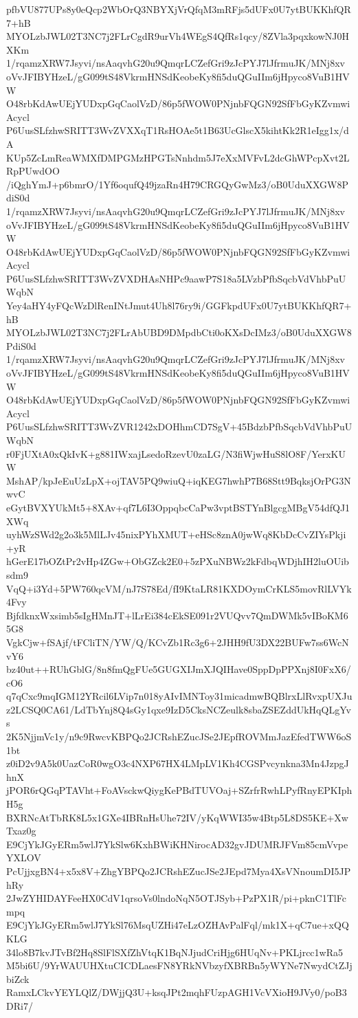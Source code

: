 pfbVU877UPs8y0eQcp2WbOrQ3NBYXjVrQfqM3mRFjs5dUFx0U7ytBUKKhfQR7+hB
MYOLzbJWL02T3NC7j2FLrCgdR9urVh4WEgS4QfRs1qcy/8ZVla3pqxkowNJ0HXKm
1/rqamzXRW7Jsyvi/nsAaqvhG20u9QmqrLCZefGri9zJcPYJ7lJfrmuJK/MNj8xv
oVvJFIBYHzeL/gG099tS48VkrmHNSdKeobeKy8fi5duQGuIIm6jHpyco8VuB1HVW
O48rbKdAwUEjYUDxpGqCaolVzD/86p5fWOW0PNjnbFQGN92SfFbGyKZvmwiAcycl
P6UusSLfzhwSRITT3WvZVXXqT1RsHOAe5t1B63UcGlscX5kihtKk2R1eIgg1x/dA
KUp5ZcLmReaWMXfDMPGMzHPGTsNnhdm5J7eXxMVFvL2dcGhWPcpXvt2LRpPUwdOO
/iQghYmJ+p6bmrO/1Yf6oqufQ49jzaRn4H79CRGQyGwMz3/oB0UduXXGW8PdiS0d
1/rqamzXRW7Jsyvi/nsAaqvhG20u9QmqrLCZefGri9zJcPYJ7lJfrmuJK/MNj8xv
oVvJFIBYHzeL/gG099tS48VkrmHNSdKeobeKy8fi5duQGuIIm6jHpyco8VuB1HVW
O48rbKdAwUEjYUDxpGqCaolVzD/86p5fWOW0PNjnbFQGN92SfFbGyKZvmwiAcycl
P6UusSLfzhwSRITT3WvZVXDHAsNHPc9aawP7S18a5LVzbPfbSqcbVdVhbPuUWqbN
Yey4aHY4yFQcWzDlRenINtJmut4Uh8l76ry9i/GGFkpdUFx0U7ytBUKKhfQR7+hB
MYOLzbJWL02T3NC7j2FLrAbUBD9DMpdbCti0oKXsDcIMz3/oB0UduXXGW8PdiS0d
1/rqamzXRW7Jsyvi/nsAaqvhG20u9QmqrLCZefGri9zJcPYJ7lJfrmuJK/MNj8xv
oVvJFIBYHzeL/gG099tS48VkrmHNSdKeobeKy8fi5duQGuIIm6jHpyco8VuB1HVW
O48rbKdAwUEjYUDxpGqCaolVzD/86p5fWOW0PNjnbFQGN92SfFbGyKZvmwiAcycl
P6UusSLfzhwSRITT3WvZVR1242xDOHhmCD7SgV+45BdzbPfbSqcbVdVhbPuUWqbN
r0FjUXtA0xQkIvK+g881IWxajLsedoRzevU0zaLG/N3fiWjwHuS8lO8F/YerxKUW
MshAP/kpJeEuUzLpX+ojTAV5PQ9wiuQ+iqKEG7hwhP7B68Stt9BqksjOrPG3NwvC
eGytBVXYUkMt5+8XAv+qf7L6I3OppqbcCaPw3vptBSTYnBlgcgMBgV54dfQJ1XWq
uyhWzSWd2g2o3k5MlLJv45nixPYhXMUT+eHSc8znA0jwWq8KbDcCvZIYsPkji+yR
hGerE17bOZtPr2vHp4ZGw+ObGZck2E0+5zPXuNBWz2kFdbqWDjhIH2luOUibsdm9
VqQ+i3Yd+5PW760qcVM/nJ7S78Ed/fI9KtaLR81KXDOymCrKLS5movRlLVYk4Fvy
BjfdknxWxsimb5sIgHMnJT+lLrEi384cEkSE091r2VUQvv7QmDWMk5vIBoKM65G8
VgkCjw+fSAjf/tFCliTN/YW/Q/KCvZb1Rc3g6+2JHH9fU3DX22BUFw7ss6WcNvY6
bz40ut++RUhGblG/8n8fmQgFUe5GUGXIJmXJQIHave0SppDpPPXnj8I0FxX6/cO6
q7qCxc9mqIGM12YRcil6LVip7n018yAIvIMNToy31micadmwBQBlrxLlRvxpUXJu
z2LCSQ0CA61/LdTbYnj8Q4sGy1qxe9IzD5CksNCZeulk8sbaZSEZddUkHqQLgYvs
2K5NjjmVc1y/n9c9RwcvKBPQo2JCRshEZucJSe2JEpfROVMmJazEfedTWW6oS1bt
z0iD2v9A5k0UazCoR0wgO3c4NXP67HX4LMpLV1Kh4CGSPvcynkna3Mn4JzpgJhnX
jPOR6rQGqPTAVht+FoAVsckwQiygKePBdTUVOaj+SZrfrRwhLPyfRnyEPKIphH5g
BXRNcAtTbRK8L5x1GXe4IBRnHsUhe72IV/yKqWWI35w4Btp5L8DS5KE+XwTxaz0g
E9CjYkJGyERm5wlJ7YkSlw6KxhBWiKHNirocAD32gvJDUMRJFVm85cmVvpeYXLOV
PcUjjxgBN4+x5x8V+ZhgYBPQo2JCRshEZucJSe2JEpd7Mya4XsVNnoumDI5JPhRy
2JwZYHIDAYFeeHX0CdV1qrsoVs0lndoNqN5OTJSyb+PzPX1R/pi+pknC1TlFcmpq
E9CjYkJGyERm5wlJ7YkSl76MsqUZHi47eLzOZHAvPalFql/mk1X+qC7ue+xQQKLG
34lo8B7kvJTvBf2Hq8SlFlSXfZhVtqK1BqNJjudCriHjg6HUqNv+PKLjrcc1wRa5
M5bi6U/9YrWAUUHXtuCICDLaesFN8YRkNVbzyfXBRBn5yWYNe7NwydCtZJjbiZck
RamxLCkvYEYLQlZ/DWjjQ3U+ksqJPt2mqhFUzpAGH1VcVXioH9JVy0/poB3DRi7/
